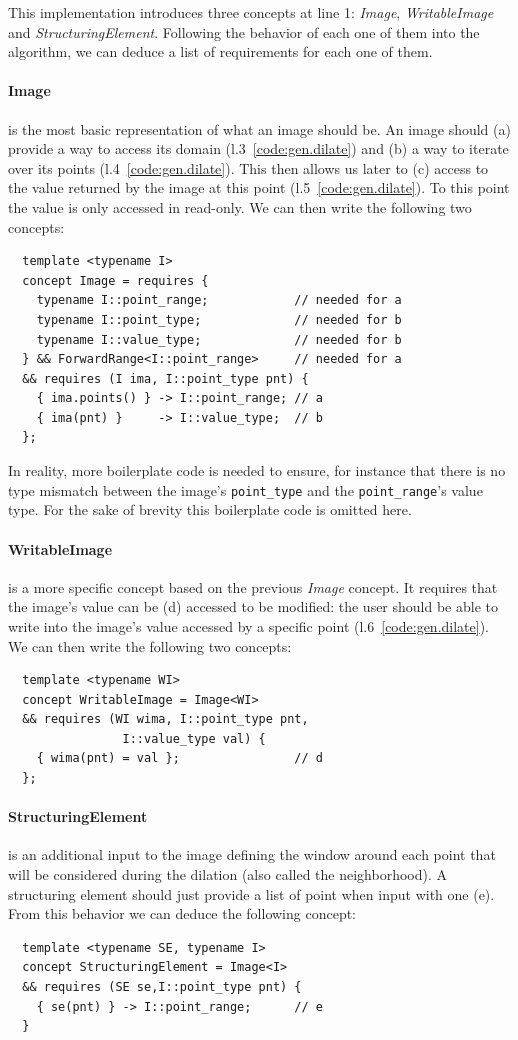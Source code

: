 This implementation introduces three concepts at line 1: \emph{Image}, \emph{WritableImage} and
\emph{StructuringElement}. Following the behavior of each one of them into the algorithm, we can deduce a list of
requirements for each one of them.

\paragraph{Image} is the most basic representation of what an image should be. An image should (a) provide a way to
access its domain (l.3~\ref{code:gen.dilate}) and (b) a way to iterate over its points (l.4~\ref{code:gen.dilate}). This
then allows us later to (c) access to the value returned by the image at this point (l.5~\ref{code:gen.dilate}). To this
point the value is only accessed in read-only. We can then write the following two concepts:
\begin{verbatim}
  template <typename I>
  concept Image = requires {
    typename I::point_range;            // needed for a
    typename I::point_type;             // needed for b
    typename I::value_type;             // needed for b
  } && ForwardRange<I::point_range>     // needed for a
  && requires (I ima, I::point_type pnt) {
    { ima.points() } -> I::point_range; // a
    { ima(pnt) }     -> I::value_type;  // b
  };
\end{verbatim}
In reality, more boilerplate code is needed to ensure, for instance that there is no type mismatch between the image's
\texttt{point\_type} and the \texttt{point\_range}'s value type. For the sake of brevity this boilerplate code is
omitted here.

\paragraph{WritableImage} is a more specific concept based on the previous \emph{Image} concept. It requires that the
image's value can be (d) accessed to be modified: the user should be able to write into the image's value accessed by a
specific point (l.6~\ref{code:gen.dilate}). We can then write the following two concepts:
\begin{verbatim}
  template <typename WI>
  concept WritableImage = Image<WI>
  && requires (WI wima, I::point_type pnt,
                I::value_type val) {
    { wima(pnt) = val };                // d
  };
\end{verbatim}

\paragraph{StructuringElement} is an additional input to the image defining the window around each point that will be
considered during the dilation (also called the neighborhood). A structuring element should just provide a list of point
when input with one (e). From this behavior we can deduce the following concept:
\begin{verbatim}
  template <typename SE, typename I>
  concept StructuringElement = Image<I>
  && requires (SE se,I::point_type pnt) {
    { se(pnt) } -> I::point_range;      // e
  }
\end{verbatim}

